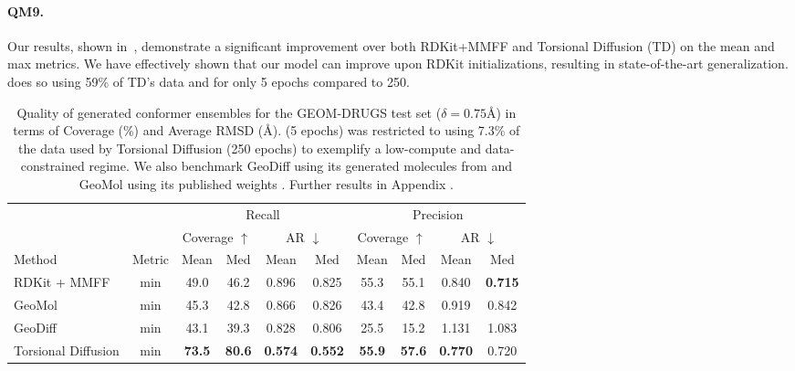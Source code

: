 \paragraph{QM9.} Our results, shown in~, demonstrate a significant improvement over both RDKit+MMFF and Torsional Diffusion (TD) on the mean and max metrics.
We have effectively shown that our model can improve upon RDKit initializations, resulting in state-of-the-art generalization. 
\model does so using 59\% of TD's data and for only 5 epochs compared to 250.

\begin{table}[t]
\caption{Quality of generated conformer ensembles for the GEOM-DRUGS test set ($\delta=0.75$\AA) in terms of Coverage (\%) and Average RMSD (\AA). \model (5 epochs) was restricted to using 7.3\% of the data used by Torsional Diffusion (250 epochs) to exemplify a low-compute and data-constrained regime. We also benchmark GeoDiff using its generated molecules from \citet{torsional-diffusion} and GeoMol using its published weights \citep{GeoMol}. Further results in Appendix .} \label{tab:results_drugs}
\begin{tabular}{lc|cccc|cccc} \toprule
               & \multicolumn{1}{l|}{} & \multicolumn{4}{c|}{Recall} & \multicolumn{4}{c}{Precision}  \\
                 & \multicolumn{1}{l|}{} & \multicolumn{2}{c}{Coverage $\uparrow$} & \multicolumn{2}{c|}{AR $\downarrow$} & \multicolumn{2}{c}{Coverage $\uparrow$} & \multicolumn{2}{c}{AR $\downarrow$} \\
Method  & Metric & Mean & Med & Mean & Med & Mean & Med & Mean & Med \\ \midrule
\multicolumn{1}{l|}{RDKit + MMFF} & min  & 49.0 & 46.2 & 0.896 & 0.825 & 55.3 & 55.1 & 0.840 & \textbf{0.715} \\
\multicolumn{1}{l|}{GeoMol} & min  & 45.3 & 42.8 & 0.866 & 0.826 & 43.4 & 42.8 & 0.919 & 0.842 \\
\multicolumn{1}{l|}{GeoDiff} & min  & 43.1 & 39.3 & 0.828 & 0.806 & 25.5 & 15.2 & 1.131 & 1.083 \\
\multicolumn{1}{l|}{Torsional Diffusion} & min & \textbf{73.5} & \textbf{80.6} & \textbf{0.574} & \textbf{0.552} & \textbf{55.9} & \textbf{57.6} & \textbf{0.770} & 0.720 \\

\end{tabular}
\end{table}

